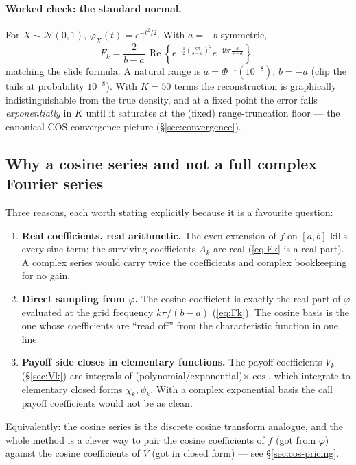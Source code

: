 \documentclass[11pt]{article}
\newcommand{\Real}{\operatorname{Re}}
\newcommand{\ii}{\mathrm{i}}
\newcommand{\ch}{\varphi}
\begin{document}
\paragraph{Worked check: the standard normal.}
For $X\sim\mathcal N(0,1)$, $\ch_X(t)=e^{-t^2/2}$. With $a=-b$ symmetric,
\[
F_k=\frac{2}{b-a}\,\Real\!\left\{e^{-\frac12\left(\frac{k\pi}{b-a}\right)^2}
e^{-\ii k\pi\frac{a}{b-a}}\right\},
\]
matching the slide formula. A natural range is $a=\Phi^{-1}(10^{-8})$, $b=-a$ (clip the tails at probability
$10^{-8}$). With $K\!=\!50$ terms the reconstruction is graphically indistinguishable from the true density,
and at a fixed point the error falls \emph{exponentially} in $K$ until it saturates at the (fixed) range-truncation
floor --- the canonical COS convergence picture (\S\ref{sec:convergence}).

\subsection{Why a cosine series and not a full complex Fourier series}\label{sec:whycos}
Three reasons, each worth stating explicitly because it is a favourite question:
\begin{enumerate}[leftmargin=*]
  \item \textbf{Real coefficients, real arithmetic.} The even extension of $f$ on $[a,b]$ kills every sine term;
  the surviving coefficients $A_k$ are real (\eqref{eq:Fk} is a real part). A complex series would carry twice
  the coefficients and complex bookkeeping for no gain.
  \item \textbf{Direct sampling from $\ch$.} The cosine coefficient is exactly the real part of $\ch$ evaluated
  at the grid frequency $k\pi/(b-a)$ (\eqref{eq:Fk}). The cosine basis is the one whose coefficients are
  ``read off'' from the characteristic function in one line.
  \item \textbf{Payoff side closes in elementary functions.} The payoff coefficients $V_k$
  (\S\ref{sec:Vk}) are integrals of (polynomial/exponential)$\times\cos$, which integrate to elementary
  closed forms $\chi_k,\psi_k$. With a complex exponential basis the call payoff coefficients would not be as
  clean.
\end{enumerate}
Equivalently: the cosine series is the discrete cosine transform analogue, and the whole method is a clever way
to pair the cosine coefficients of $f$ (got from $\ch$) against the cosine coefficients of $V$ (got in closed
form) --- see \S\ref{sec:cos-pricing}.
\end{document}
